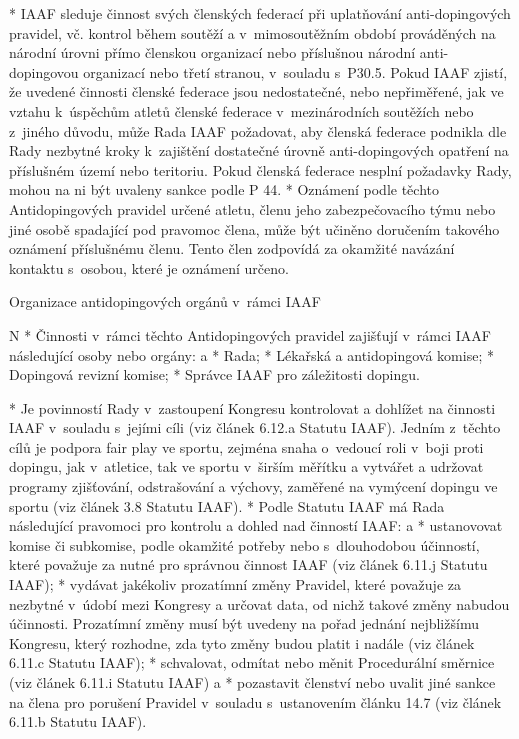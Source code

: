 * IAAF sleduje činnost svých členských federací při uplatňování anti-dopingových pravidel, vč. kontrol během soutěží a v~mimosoutěžním období prováděných na národní úrovni přímo členskou organizací nebo příslušnou národní anti-dopingovou organizací nebo třetí stranou, v~souladu s~P30.5. Pokud IAAF zjistí, že uvedené činnosti členské federace jsou nedostatečné, nebo nepřiměřené, jak ve vztahu k~úspěchům atletů členské federace v~mezinárodních soutěžích nebo z~jiného důvodu, může Rada IAAF požadovat, aby členská federace podnikla dle Rady nezbytné kroky k~zajištění dostatečné úrovně anti-dopingových opatření na příslušném území nebo teritoriu. Pokud členská federace nesplní požadavky Rady, mohou na ni být uvaleny sankce podle P 44.
* Oznámení podle těchto Antidopingových pravidel určené atletu, členu jeho zabezpečovacího týmu nebo jiné osobě spadající pod pravomoc člena, může být učiněno doručením takového oznámení příslušnému členu. Tento člen zodpovídá za okamžité navázání kontaktu s~osobou, které je oznámení určeno.
\enditems

\secc Organizace antidopingových orgánů v~rámci IAAF

\begitems \style N
* Činnosti v~rámci těchto Antidopingových pravidel zajišťují v~rámci IAAF následující osoby nebo orgány:
  \begitems \style a
  * Rada;
  * Lékařská a antidopingová komise;
  * Dopingová revizní komise;
  * Správce IAAF pro záležitosti dopingu.
  \enditems

* Je povinností Rady v~zastoupení Kongresu kontrolovat a dohlížet na činnosti IAAF v~souladu s~jejími cíli (viz článek 6.12.a Statutu IAAF). Jedním z~těchto cílů je podpora fair play ve sportu, zejména snaha o~vedoucí roli v~boji proti dopingu, jak v~atletice, tak ve sportu v~širším měřítku a vytvářet a udržovat programy zjišťování, odstrašování a výchovy, zaměřené na vymýcení dopingu ve sportu (viz článek 3.8 Statutu IAAF).
* Podle Statutu IAAF má Rada následující pravomoci pro kontrolu a dohled nad činností IAAF:
  \begitems \style a
  * ustanovovat komise či subkomise, podle okamžité potřeby nebo s~dlouhodobou účinností, které považuje za nutné pro správnou činnost IAAF (viz článek 6.11.j Statutu IAAF);
  * vydávat jakékoliv prozatímní změny Pravidel, které považuje za nezbytné v~údobí mezi Kongresy a určovat data, od nichž takové změny nabudou účinnosti. Prozatímní změny musí být uvedeny na pořad jednání nejbližšímu Kongresu, který rozhodne, zda  tyto změny budou platit i nadále (viz článek 6.11.c Statutu IAAF);
  * schvalovat, odmítat nebo měnit Procedurální směrnice (viz článek 6.11.i Statutu IAAF) a
  * pozastavit členství nebo uvalit jiné sankce na člena pro porušení Pravidel v~souladu s~ustanovením článku 14.7 (viz článek 6.11.b Statutu IAAF).
  \enditems

